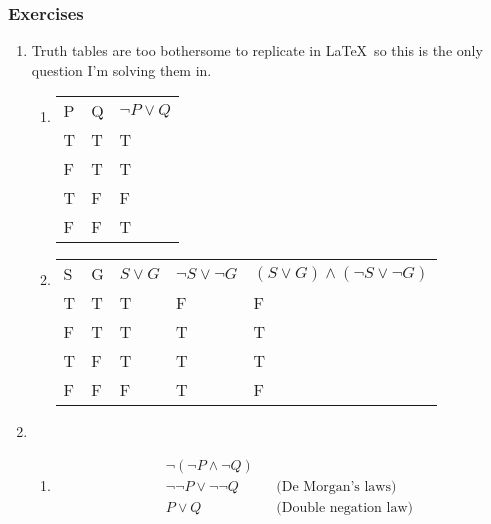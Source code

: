 \documentclass[a4paper, 11pt]{article}
\newcommand\setItemnumber[1]{\setcounter{enumi}{\numexpr#1-1\relax}}
\begin{document}
\clearpage

\subsubsection{Exercises}
\begin{enumerate}
  \item Truth tables are too bothersome to replicate in \LaTeX ~so this is the only question I'm solving them in.

        \begin{enumerate}
          \item
                \begin{tabular}{lll}
                  P & Q & $\neg P \vee Q$ \\
                  T & T & T               \\
                  F & T & T               \\
                  T & F & F               \\
                  F & F & T
                \end{tabular}
          \item
                \begin{tabular}{lllll}
                  S                    & G &
                  $S\vee G$            &
                  $\neg S \vee \neg G$ &
                  $(S\vee G) \wedge (\neg S \vee \neg G)$ \\
                  T                    & T & T & F & F    \\
                  F                    & T & T & T & T    \\
                  T                    & F & T & T & T    \\
                  F                    & F & F & T & F
                \end{tabular}
        \end{enumerate}
        \setItemnumber{11}
  \item
        \begin{enumerate}
          \item
                \begin{align*}
                   & \neg (\neg P \wedge \neg Q)
                  \\ &\neg \neg P \vee \neg \neg Q && \text{(De Morgan's laws)}
                  \\ &P \vee Q 	&& \text{(Double negation law)}
                \end{align*}


\end{enumerate}
\end{enumerate}
\end{document}
